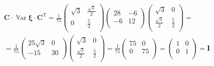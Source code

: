 \documentclass[12pt]{spbstu-task}
\begin{document}
\begin{gather*}
  \mathbf{C}\cdot\operatorname{\mathbb{V}ar}\boldsymbol{\xi}\cdot\mathbf{C}^\mathsf{T} =
  \frac{1}{75}\begin{pmatrix}
    \sqrt{3} & \frac{\sqrt{3}}{2} \\
    0 & \frac{5}{2} \\
  \end{pmatrix}\begin{pmatrix}
    28 & -6 \\
    -6 & 12 \\
  \end{pmatrix}\begin{pmatrix}
    \sqrt{3} & 0 \\
    \frac{\sqrt{3}}{2} & \frac{5}{2} \\
  \end{pmatrix} = \\ =
  \frac{1}{75}\begin{pmatrix}
    25\sqrt{3} & 0 \\
    -15 & 30 \\
  \end{pmatrix}\begin{pmatrix}
    \sqrt{3} & 0 \\
    \frac{\sqrt{3}}{2} & \frac{5}{2} \\
  \end{pmatrix} =
  \frac{1}{75}\begin{pmatrix}
    75 & 0 \\
    0 & 75 \\
  \end{pmatrix} =
  \begin{pmatrix}
    1 & 0 \\
    0 & 1 \\
  \end{pmatrix} = \mathbf{I}
\end{gather*}
\end{document}
